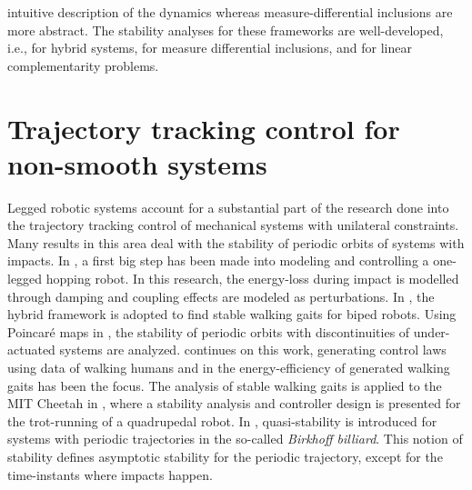\documentclass[../DC2017114Bouma.tex]{subfiles}
\begin{document}
intuitive description of the dynamics whereas measure-differential inclusions are more abstract. The stability analyses for these frameworks are well-developed, i.e., \cite{Ye1998,Lygeros2003,Goebel2009} for hybrid systems, \cite{Pereira2004,Brogliato2004,Leine2008} for measure differential inclusions, and \cite{Brogliato1999,Camlibel2006,Camlibel2007} for linear complementarity problems.

\section{Trajectory tracking control for non-smooth systems}
Legged robotic systems account for a substantial part of the research done into the trajectory tracking control of mechanical systems with unilateral constraints. Many results in this area deal with the stability of periodic orbits of systems with impacts. In \cite{Raibert1984}, a first big step has been made into modeling and controlling a one-legged hopping robot. In this research, the energy-loss during impact is modelled through damping and coupling effects are modeled as perturbations. In \cite{Grizzle2001}, the hybrid framework is adopted to find stable walking gaits for biped robots. Using Poincar\'{e} maps in \cite{Parker1989}, the stability of periodic orbits with discontinuities of under-actuated systems are analyzed. \cite{Ames2014} continues on this work, generating control laws using data of walking humans and in \cite{Reher2016} the energy-efficiency of generated walking gaits has been the focus. The analysis of stable walking gaits is applied to the MIT Cheetah in \cite{Hyun2014}, where a stability analysis and controller design is presented for the trot-running of a quadrupedal robot. In \cite{Menini2001,Galeani2008}, quasi-stability is introduced for systems with periodic trajectories in the so-called \textit{Birkhoff billiard}. This notion of stability defines asymptotic stability for the periodic trajectory, except for the time-instants where impacts happen.
  
\end{document}
